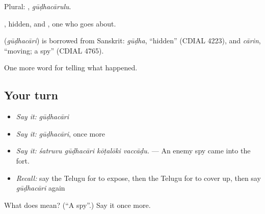 Plural: , \emph{gūḍhacārulu}.

, hidden, and , one who goes about.

\begin{cousinweb}
\textbf{} (\emph{gūḍhacāri}) is borrowed from Sanskrit: \emph{gūḍha}, \textquotedblleft{}hidden\textquotedblright{} (CDIAL 4223), and \emph{cārin}, \textquotedblleft{}moving; a spy\textquotedblright{} (CDIAL 4765).
\end{cousinweb}

\begin{grammarlens}[title={What you've built}]
One more word for telling what happened.
\end{grammarlens}

\subsection*{Your turn}
\begin{itemize}
\raggedright
  \item \emph{Say it:} \emph{gūḍhacāri}
  \item \emph{Say it:} \emph{gūḍhacāri}, once more
  \item \emph{Say it:} \emph{śatruvu gūḍhacāri kōṭalōki vaccāḍu.} — An enemy spy came into the fort.
  \item \emph{Recall:} say the Telugu for to expose, then the Telugu for to cover up, then say \emph{gūḍhacāri} again
\end{itemize}

\begin{tcolorbox}[breakable,colback=teal!4,colframe=teal!35!black,title={Before you move on}]
What does  mean? (\textquotedblleft{}A spy\textquotedblright{}.) Say it once more.
\end{tcolorbox}
